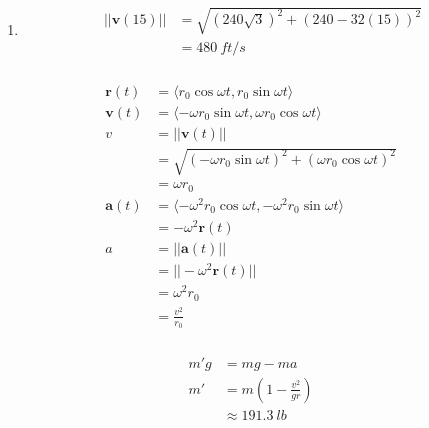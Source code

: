 \documentclass{article}
\begin{document}
\begin{enumerate}
  \item

        \begin{align*}
          ||\mathbf{v}(15)|| & = \sqrt{(240 \sqrt{3})^2 + (240 - 32 (15))^2} \\
                             & = \qty{480}{ft/s}
        \end{align*}
\end{enumerate}

\setcounter{subsubsection}{22}
\subsubsection{}

\begin{align*}
  \mathbf{r}(t) & = \langle r_0 \cos \omega t, r_0 \sin \omega t \rangle                     \\
  \mathbf{v}(t) & = \langle -\omega r_0 \sin \omega t, \omega r_0 \cos \omega t \rangle      \\
  v             & = ||\mathbf{v}(t)||                                                        \\
                & = \sqrt{(-\omega r_0 \sin \omega t)^2 + (\omega r_0 \cos \omega t)^2}      \\
                & = \omega r_0                                                               \\
  \mathbf{a}(t) & = \langle -\omega^2 r_0 \cos \omega t, -\omega^2 r_0 \sin \omega t \rangle \\
                & = -\omega^2 \mathbf{r}(t)                                                  \\
  a             & = ||\mathbf{a}(t)||                                                        \\
                & = ||-\omega^2 \mathbf{r}(t)||                                              \\
                & = \omega^2 r_0                                                             \\
                & = \frac{v^2}{r_0}
\end{align*}

\setcounter{subsubsection}{24}
\subsubsection{}

\begin{align*}
  m' g & = m g - m a                            \\
  m'   & = m \left( 1 - \frac{v^2}{g r} \right) \\
       & \approx \qty{191.3}{lb}
\end{align*}
\end{document}

